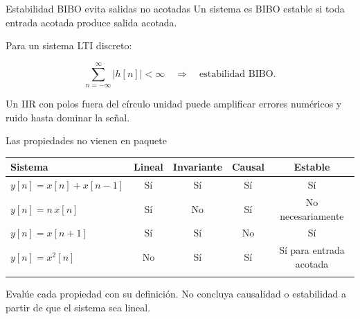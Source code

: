 \documentclass[
  ignorenonframetext,
  aspectratio=169,
  spanish,
  professionalfonts]{beamer}
\newcounter{none} %
\begin{document}
\begin{frame}{Estabilidad BIBO evita salidas no acotadas}
\protect{}\label{estabilidad-bibo-evita-salidas-no-acotadas}
Un sistema es BIBO estable si toda entrada acotada produce salida
acotada.

Para un sistema LTI discreto:

\[
\sum_{n=-\infty}^{\infty}|h[n]|<\infty
\quad \Longrightarrow \quad \text{estabilidad BIBO}.
\]

\begin{tcolorbox}[enhanced jigsaw, arc=.35mm, bottomrule=.15mm, bottomtitle=1mm, breakable, colback=white, colbacktitle=quarto-callout-warning-color!10!white, colframe=quarto-callout-warning-color-frame, coltitle=black, left=2mm, leftrule=.75mm, opacityback=0, opacitybacktitle=0.6, rightrule=.15mm, title={Importancia práctica}, titlerule=0mm, toprule=.15mm, toptitle=1mm]

Un IIR con polos fuera del círculo unidad puede amplificar errores
numéricos y ruido hasta dominar la señal.

\end{tcolorbox}
\end{frame}

\begin{frame}{Las propiedades no vienen en paquete}
\protect{}\label{las-propiedades-no-vienen-en-paquete}
{\def\LTcaptype{none} %
\begin{longtable}[]{@{}lcccc@{}}
\toprule\noalign{}
Sistema & Lineal & Invariante & Causal & Estable \\
\midrule\noalign{}
\endhead
\(y[n]=x[n]+x[n-1]\) & Sí & Sí & Sí & Sí \\
\(y[n]=n\,x[n]\) & Sí & No & Sí & No necesariamente \\
\(y[n]=x[n+1]\) & Sí & Sí & No & Sí \\
\(y[n]=x^2[n]\) & No & Sí & Sí & Sí para entrada acotada \\
\bottomrule\noalign{}
\end{longtable}
}

\begin{tcolorbox}[enhanced jigsaw, arc=.35mm, bottomrule=.15mm, bottomtitle=1mm, breakable, colback=white, colbacktitle=quarto-callout-tip-color!10!white, colframe=quarto-callout-tip-color-frame, coltitle=black, left=2mm, leftrule=.75mm, opacityback=0, opacitybacktitle=0.6, rightrule=.15mm, title={Método}, titlerule=0mm, toprule=.15mm, toptitle=1mm]

Evalúe cada propiedad con su definición. No concluya causalidad o
estabilidad a partir de que el sistema sea lineal.

\end{tcolorbox}
\end{frame}
\end{document}
